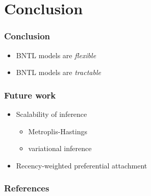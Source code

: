 \documentclass[final,hyperref={pdfpagelabels=false},noamsthm]{beamer}
\begin{document}
\section{Conclusion}
\begin{frame}
	\frametitle{Conclusion}
	\begin{itemize}
		\item BNTL models are \textit{flexible}
		\item BNTL models are \textit{tractable}
	\end{itemize}
\end{frame}

\begin{frame}
	\frametitle{Future work}
	\begin{itemize}
		\item Scalability of inference
		\begin{itemize}
			\item Metroplis-Hastings
			\item variational inference \cite{linderman2017}
		\end{itemize}
		\item Recency-weighted preferential attachment
	\end{itemize}
\end{frame}

\begin{frame}
	\frametitle{References}
	\tiny{
	}
\end{frame}
\end{document}
